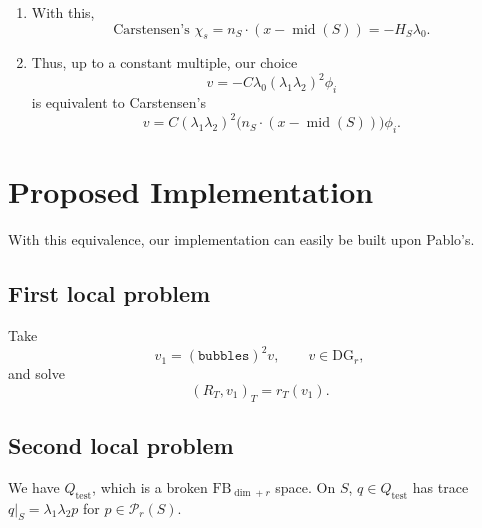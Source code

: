 \documentclass[12pt,a4paper]{article}
\newcommand{\PP}{\mathcal{P}}
\newcommand{\qtest}{Q_{\mathrm{test}}}
\newcommand{\bubbles}{\texttt{bubbles}}
\newcommand{\midS}{\operatorname{mid}(S)}
\begin{document}
\begin{enumerate}[label=\roman*)]
    Thus,
    \begin{align}
        n_S\cdot(a_0-p)&=-H,\\
        \Longrightarrow\qquad n_S\cdot(x-p)&=-\lambda_0H,\\
        \Longrightarrow\qquad \lambda_0&=-\frac{n_S\cdot(x-p)}{H},\\
        \Longrightarrow\qquad \lambda_0&=-\frac{n_S\cdot(x-\midS)}{H}.
    \end{align}

    \item With this,
    \begin{equation}
        \text{Carstensen's } \chi_s
          =n_S\cdot(x-\midS)=-H_S\lambda_0.
    \end{equation}

    \item Thus, up to a constant multiple, our choice
    \begin{equation}
        v=-C\lambda_0(\lambda_1\lambda_2)^2\phi_i
    \end{equation}
    is equivalent to Carstensen's
    \begin{equation}
        v=C(\lambda_1\lambda_2)^2
                  \bigl(n_S\cdot(x-\midS)\bigr)\phi_i.
    \end{equation}
\end{enumerate}


\newpage

\section{Proposed Implementation}

With this equivalence, our implementation can easily be built upon Pablo's.

\subsection{First local problem}
Take
\begin{equation}
    v_1=(\bubbles)^2v,
    \qquad v\in\mathrm{DG}_r,
\end{equation}
and solve
\begin{equation}
    (R_T,v_1)_T=r_T(v_1).
\end{equation}

\subsection{Second local problem}
We have $\qtest$, which is a broken $\mathrm{FB}_{\dim+r}$ space. On $S$,
$q\in\qtest$ has trace $q|_S=\lambda_1\lambda_2p$ for
$p\in\PP_r(S)$.
\end{document}
